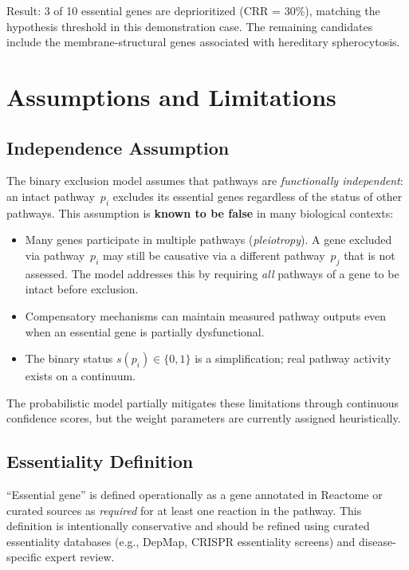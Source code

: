 \documentclass[12pt,a4paper]{article}
\begin{document}
Result: 3 of 10 essential genes are deprioritized (CRR = 30\%), matching the hypothesis threshold in this demonstration case. The remaining candidates include the membrane-structural genes associated with hereditary spherocytosis.

\section{Assumptions and Limitations}
\label{sec:limitations}

\subsection{Independence Assumption}

The binary exclusion model assumes that pathways are \emph{functionally independent}: an intact pathway~$p_i$ excludes its essential genes regardless of the status of other pathways. This assumption is \textbf{known to be false} in many biological contexts:

\begin{itemize}
    \item Many genes participate in multiple pathways (\emph{pleiotropy}). A gene excluded via pathway~$p_i$ may still be causative via a different pathway~$p_j$ that is not assessed. The model addresses this by requiring \emph{all} pathways of a gene to be intact before exclusion.
    \item Compensatory mechanisms can maintain measured pathway outputs even when an essential gene is partially dysfunctional.
    \item The binary status $s(p_i) \in \{0, 1\}$ is a simplification; real pathway activity exists on a continuum.
\end{itemize}

The probabilistic model partially mitigates these limitations through continuous confidence scores, but the weight parameters are currently assigned heuristically.

\subsection{Essentiality Definition}

``Essential gene'' is defined operationally as a gene annotated in Reactome or curated sources as \emph{required} for at least one reaction in the pathway. This definition is intentionally conservative and should be refined using curated essentiality databases (e.g., DepMap, CRISPR essentiality screens) and disease-specific expert review.
\end{document}
